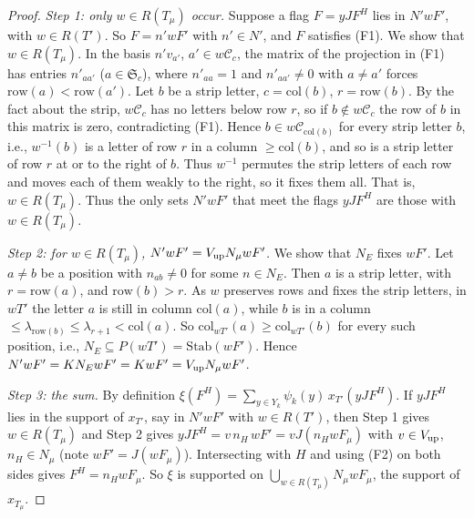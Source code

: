 \documentclass[11pt, letterpaper]{amsart}
\theoremstyle{definition}
\theoremstyle{remark}
\newcommand{\row}{\mathrm{row}}
\newcommand{\col}{\mathrm{col}}
\newcommand{\Stab}{\mathrm{Stab}}
\begin{document}
\begin{proof}
\emph{Step 1: only $w\in R(T_\mu)$ occur.} Suppose a flag $F=yJF^H$ lies in $N'wF'$, with $w\in R(T')$. So $F=n'wF'$ with $n'\in N'$, and $F$ satisfies (F1). We show that $w\in R(T_\mu)$. In the basis $n'v_{a'}$, $a'\in w\mathcal C_c$, the matrix of the projection in (F1) has entries $n'_{aa'}$ ($a\in\mathfrak S_c$), where $n'_{aa}=1$ and $n'_{aa'}\ne0$ with $a\ne a'$ forces $\row(a)<\row(a')$. Let $b$ be a strip letter, $c=\col(b)$, $r=\row(b)$. By the fact about the strip, $w\mathcal C_c$ has no letters below row $r$, so if $b\notin w\mathcal C_c$ the row of $b$ in this matrix is zero, contradicting (F1). Hence $b\in w\mathcal C_{\col(b)}$ for every strip letter $b$, i.e., $w^{-1}(b)$ is a letter of row $r$ in a column $\ge\col(b)$, and so is a strip letter of row $r$ at or to the right of $b$. Thus $w^{-1}$ permutes the strip letters of each row and moves each of them weakly to the right, so it fixes them all. That is, $w\in R(T_\mu)$. Thus the only sets $N'wF'$ that meet the flags $yJF^H$ are those with $w\in R(T_\mu)$.

\emph{Step 2: for $w\in R(T_\mu)$, $N'wF'=V_{\rm up}N_\mu wF'$.} We show that $N_E$ fixes $wF'$. Let $a\ne b$ be a position with $n_{ab}\ne0$ for some $n\in N_E$. Then $a$ is a strip letter, with $r=\row(a)$, and $\row(b)>r$. As $w$ preserves rows and fixes the strip letters, in $wT'$ the letter $a$ is still in column $\col(a)$, while $b$ is in a column $\le\lambda_{\row(b)}\le\lambda_{r+1}<\col(a)$. So $\col_{wT'}(a)\ge\col_{wT'}(b)$ for every such position, i.e., $N_E\subseteq P(wT')=\Stab(wF')$. Hence $N'wF'=KN_EwF'=KwF'=V_{\rm up}N_\mu wF'$.

\emph{Step 3: the sum.} By definition $\xi(F^H)=\sum_{y\in Y_k}\psi_k(y)\,x_{T'}(yJF^H)$. If $yJF^H$ lies in the support of $x_{T'}$, say in $N'wF'$ with $w\in R(T')$, then Step 1 gives $w\in R(T_\mu)$ and Step 2 gives $yJF^H=v\,n_H\,wF'=vJ(n_HwF_\mu)$ with $v\in V_{\rm up}$, $n_H\in N_\mu$ (note $wF'=J(wF_\mu)$). Intersecting with $H$ and using (F2) on both sides gives $F^H=n_HwF_\mu$. So $\xi$ is supported on $\bigcup_{w\in R(T_\mu)}N_\mu wF_\mu$, the support of $x_{T_\mu}$.


\end{proof}
\end{document}
